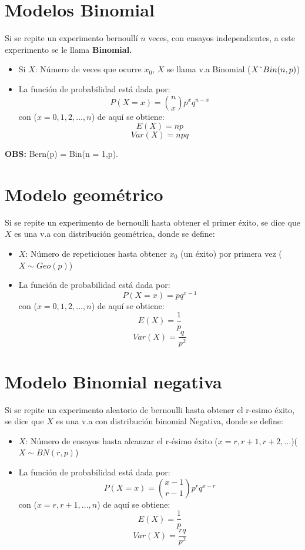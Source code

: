 \documentclass[12pt,twocolumn,a4paper]{report}
\begin{document}
\section*{Modelos Binomial}
Si se repite un experimento bernoullí $n$ veces, con ensayos independientes, a este experimento se le llama \textbf{Binomial.}
\begin{itemize}
\setlength\itemsep{0.001cm}
\item{Si $X$: Número de veces que ocurre $x_0$, $X$ se llama v.a Binomial ($X \string ~ Bin(n,p)$)}
\item{La función de probabilidad está dada por: 
$$
P(X= x) = \binom{n}{x}p^x q^{n-x}
$$
con ($x= 0,1,2,...,n$) de aquí se obtiene:
$$
E(X) = np
$$
$$
Var(X) = npq
$$}
\end{itemize}
\textbf{OBS:} Bern(p) = Bin(n = 1,p). 

\section*{Modelo geométrico}
Si se repite un experimento de bernoulli hasta obtener el primer éxito, se dice que $X$ es una v.a con distribución geométrica, donde se define: 
\begin{itemize}
\setlength\itemsep{0.001cm}
\item{$X$: Número de repeticiones hasta obtener $x_0$ (un éxito) por primera vez ($X \sim Geo(p)$)}
\item{La función de probabilidad está dada por: 
$$
P(X= x) = pq^{x-1}
$$
con ($x= 0,1,2,...,n$) de aquí se obtiene:
$$
E(X) = \dfrac{1}{p}
$$
$$
Var(X) = \dfrac{q}{p^2}
$$}
\end{itemize}

\section*{Modelo Binomial negativa}
Si se repite un experimento aleatorio de bernoulli hasta obtener el r-esimo éxito, se dice que $X$ es una v.a con distribución binomial Negativa, donde se define: 
\begin{itemize}
\setlength\itemsep{0.001cm}
\item{$X$: Número de ensayos hasta alcanzar el r-ésimo éxito ($x = r, r+1, r+2,... $)($X \sim BN(r,p)$)}
\item{La función de probabilidad está dada por: 
$$
P(X= x) = \binom{x-1}{r-1}p^r q^{x-r}
$$
con ($x= r, r+1,...,n$) de aquí se obtiene:
$$
E(X) = \dfrac{1}{p}
$$
$$
Var(X) = \dfrac{rq}{p^2}
$$}
\end{itemize}
\end{document}
